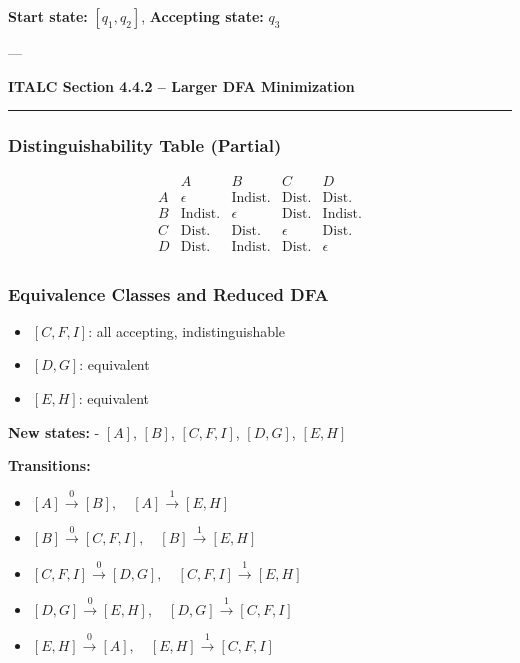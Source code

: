 \documentclass{article}
\theoremstyle{theorem}
\theoremstyle{definition}
\theoremstyle{remark}
\begin{document}
\textbf{Start state:} \( [q_1, q_2] \), \quad \textbf{Accepting state:} \( q_3 \)

---

\textbf{ITALC Section 4.4.2 – Larger DFA Minimization} \\
\vspace{0.5em}
\hrule
\vspace{0.5em}
\subsubsection*{Distinguishability Table (Partial)}

\[
\begin{array}{c|cccc}
     & A & B & C & D \\
\hline
A & \epsilon & \text{Indist.} & \text{Dist.} & \text{Dist.} \\
B & \text{Indist.} & \epsilon & \text{Dist.} & \text{Indist.} \\
C & \text{Dist.} & \text{Dist.} & \epsilon & \text{Dist.} \\
D & \text{Dist.} & \text{Indist.} & \text{Dist.} & \epsilon \\
\end{array}
\]

\subsubsection*{Equivalence Classes and Reduced DFA}

\begin{itemize}
    \item \( [C, F, I] \): all accepting, indistinguishable
    \item \( [D, G] \): equivalent
    \item \( [E, H] \): equivalent
\end{itemize}

\textbf{New states:}  
- \( [A] \), \( [B] \), \( [C, F, I] \), \( [D, G] \), \( [E, H] \)

\textbf{Transitions:}
\begin{itemize}
    \item \( [A] \xrightarrow{0} [B], \quad [A] \xrightarrow{1} [E, H] \)
    \item \( [B] \xrightarrow{0} [C, F, I], \quad [B] \xrightarrow{1} [E, H] \)
    \item \( [C, F, I] \xrightarrow{0} [D, G], \quad [C, F, I] \xrightarrow{1} [E, H] \)
    \item \( [D, G] \xrightarrow{0} [E, H], \quad [D, G] \xrightarrow{1} [C, F, I] \)
    \item \( [E, H] \xrightarrow{0} [A], \quad [E, H] \xrightarrow{1} [C, F, I] \)
\end{itemize}
\end{document}
